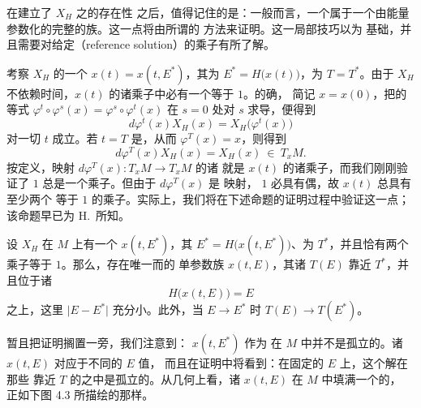 在建立了\trHamiltonianVectorField{} $X_{H}$ 之\trPeriodicSolution{}的存在性%
之后，值得记住的是：一般而言，一个\trPeriodicSolution{}属于一个由能量%
参数化的完整的\trPeriodicSolution{}族。这一点将由所谓的\trPoincare{}%
\trContinuation{}方法来证明。这一局部技巧以\trImplicitFunctionTheorem{}为%
基础，并且需要对给定\textbf{\trReferenceSolution}（reference solution）的\trFloquet{}乘子有所了解。

考察 $X_{H}$ 的一个\trPeriodicSolution{} $x(t)=x(t,E^{*})$，其\trEnergy{}为%
$E^{*}=H\bigl(x(t)\bigr)$，\trPeriodic{}为 $T=T^{*}$。由于\trVectorField{}%
$X_{H}$ 不依赖时间，$x(t)$ 的诸\trFloquet{}乘子中必有一个等于 $1$。的确，%
简记 $x=x(0)$，把\trFlow{}的等式%
$\varphi^{t}\circ\varphi^{s}(x)=\varphi^{s}\circ\varphi^{t}(x)$ 在 $s=0$ 处对%
$s$ 求导，便得到
\[
d\varphi^{t}(x)X_{H}(x)=X_{H}\bigl(\varphi^{t}(x)\bigr)
\]
对一切 $t$ 成立。若 $t=T$ 是\trPeriodic，从而 $\varphi^{T}(x)=x$，则得到
\[
d\varphi^{T}(x)X_{H}(x)=X_{H}(x)\ \in\ T_{x}M.
\]
按定义，\trLinear{}映射 $d\varphi^{T}(x):T_{x}M\to T_{x}M$ 的诸\trEigenvalue{}%
就是\trPeriodicSolution{} $x(t)$ 的诸\trFloquet{}乘子，而我们刚刚验证了 $1$%
总是一个\trFloquet{}乘子。但由于 $d\varphi^{T}(x)$ 是\trSymplectic\trLinear{}%
映射，\trEigenvalue{} $1$ 必具有偶\trMultiplicity，故 $x(t)$ 总具有至少两个%
等于 $1$ 的\trFloquet{}乘子。实际上，我们将在下述命题的证明过程中验证这一点；%
该命题早已为 H.~\trPoincare{}所知。

\begin{proposition}\label{prop:poincare-continuation}
设 $X_{H}$ 在 $M$ 上有一个\trPeriodicSolution{} $x(t,E^{*})$，其\trEnergy{}%
$E^{*}=H\bigl(x(t,E^{*})\bigr)$、\trPeriodic{}为 $T^{*}$，并且恰有两个%
\trFloquet{}乘子等于 $1$。那么，存在唯一而\trSmooth{}的\trPeriodicSolution{}%
单参数族 $x(t,E)$，其诸\trPeriodic{} $T(E)$ 靠近 $T^{*}$，并且位于诸%
\trEnergySurface
\[
H\bigl(x(t,E)\bigr)=E
\]
之上，这里 $\lvert E-E^{*}\rvert$ 充分小。此外，当 $E\to E^{*}$ 时%
$T(E)\to T(E^{*})$。
\end{proposition}

暂且把证明搁置一旁，我们注意到：\trReferenceSolution{} $x(t,E^{*})$ 作为\trPeriodicSolution{}%
在 $M$ 中并不是孤立的。诸\trPeriodicSolution{} $x(t,E)$ 对应于不同的 $E$ 值，%
而且在证明中将看到：在固定的\trEnergySurface{} $E$ 上，这个解在那些%
\trPeriodic{}靠近 $T$ 的\trPeriodicSolution{}之中是孤立的。从几何上看，诸%
\trPeriodicSolution{} $x(t,E)$ 在 $M$ 中填满一个\trEmbedding{}的\trCylinder，%
正如下图 4.3 所描绘的那样。

